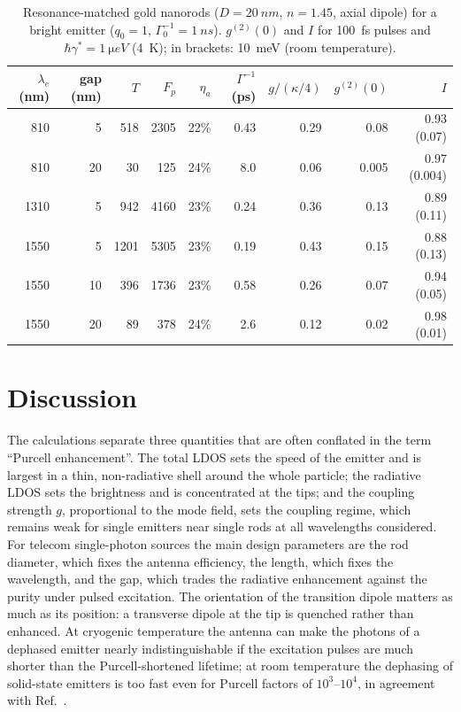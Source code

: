 \documentclass[11pt,a4paper]{article}
\newcommand{\Fp}{F_p}
\begin{document}
\begin{table}[tbp]\centering\small
\caption{Resonance-matched gold nanorods ($D=\SI{20}{nm}$, $n=1.45$, axial dipole) for a bright emitter
($q_0=1$, $\Gamma_0^{-1}=\SI{1}{ns}$). $g^{(2)}(0)$ and $I$ for \SI{100}{fs} pulses and
$\hbar\gamma^*=\SI{1}{\micro eV}$ (\SI{4}{K}); in brackets: \SI{10}{meV} (room temperature).}\label{tab:design}
\begin{tabular}{rrrrrrrrr}\toprule
$\lambda_e$ (nm) & gap (nm) & $T$ & $\Fp$ & $\eta_a$ & $\Gamma^{-1}$ (ps) & $g/(\kappa/4)$ & $g^{(2)}(0)$ & $I$\\\midrule
810  & 5  & 518  & 2305 & 22\% & 0.43 & 0.29 & 0.08 & 0.93 (0.07)\\
810  & 20 & 30   & 125  & 24\% & 8.0  & 0.06 & 0.005 & 0.97 (0.004)\\
1310 & 5  & 942  & 4160 & 23\% & 0.24 & 0.36 & 0.13 & 0.89 (0.11)\\
1550 & 5  & 1201 & 5305 & 23\% & 0.19 & 0.43 & 0.15 & 0.88 (0.13)\\
1550 & 10 & 396  & 1736 & 23\% & 0.58 & 0.26 & 0.07 & 0.94 (0.05)\\
1550 & 20 & 89   & 378  & 24\% & 2.6  & 0.12 & 0.02 & 0.98 (0.01)\\\bottomrule
\end{tabular}
\end{table}

\section{Discussion}
The calculations separate three quantities that are often conflated in the term ``Purcell enhancement''. The total
LDOS sets the speed of the emitter and is largest in a thin, non-radiative shell around the whole particle; the
radiative LDOS sets the brightness and is concentrated at the tips; and the coupling strength $g$, proportional to the
mode field, sets the coupling regime, which remains weak for single emitters near single rods at all wavelengths
considered. For telecom single-photon sources the main design parameters are the rod diameter, which fixes the antenna
efficiency, the length, which fixes the wavelength, and the gap, which trades the radiative enhancement against
the purity under pulsed excitation. The orientation of the transition dipole matters as much as its position: a
transverse dipole at the tip is quenched rather than enhanced. At cryogenic temperature the antenna can make the
photons of a dephased emitter nearly indistinguishable if the excitation pulses are much shorter than the
Purcell-shortened lifetime; at room temperature the dephasing of solid-state emitters is too fast even for Purcell
factors of $10^3$--$10^4$, in agreement with Ref.~\cite{grange2015}.
\end{document}
